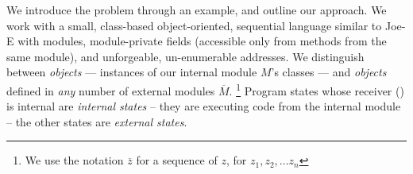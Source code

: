  \newcommand{\pwd}{key}

\renewcommand{\password}{key\xspace}

We introduce the problem  through an example, and outline our
approach.  We work with a  small, class-based object-oriented, sequential language similar to Joe-E \cite{JoeE} with modules,   module-private fields
({accessible} only from   methods {from} the same module),
and unforgeable, un-enumerable addresses.
We distinguish between  \emph{\internalO  objects} --- instances of our internal module $M$'s classes ---
and \emph{\externalO  objects} defined in
\emph{any} number of external modules $\overline M$.%
\!\footnote{We use the notation $\overline z$ for a sequence of $z$, \ie for $z_1,z_2,...z_n$ }
Program states whose receiver () is internal are \emph{internal states} -- they are executing code from the internal module -- the other states are  \emph{external states}.
